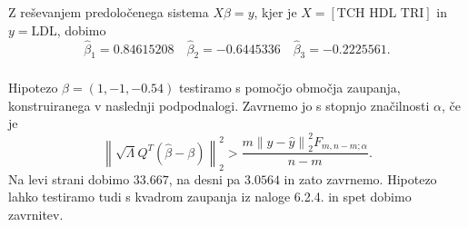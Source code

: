 \documentclass[ letterpaper, titlepage, fleqn]{article}
\newcommand{\norm}[1]{\left\lVert#1\right\rVert}
\begin{document}
\subsubsection{}
Z reševanjem predoločenega sistema $X\hat{\beta} = y$, kjer je $X = [\text{TCH HDL TRI}]$ in $y = \text{LDL}$,  dobimo
$$\hat{\beta}_1 = 0.84615208 \quad \hat{\beta}_2 = -0.6445336 \quad \hat{\beta}_3 =-0.2225561.$$

\subsubsection{}
Hipotezo  $\beta = (1,-1,-0.54)$  testiramo s pomočjo območja zaupanja, konstruiranega v naslednji podpodnalogi. Zavrnemo jo s stopnjo značilnosti $\alpha$, če je
$$\norm{\sqrt{\Lambda} Q^T (\hat{\beta} - \beta)}_2^2 > \frac{m \norm{y - \hat{y}}_2^2 F_{m, n-m; \alpha}}{n-m}.$$
Na levi strani dobimo $33.667$, na desni pa $3.0564$ in zato zavrnemo. Hipotezo lahko testiramo tudi s kvadrom zaupanja iz naloge 6.2.4. in spet dobimo zavrnitev.
\end{document}
